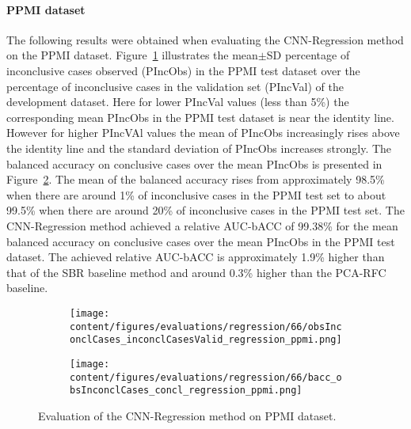 
\paragraph{PPMI dataset}

The following results were obtained when evaluating the CNN-Regression method on the PPMI dataset.
Figure~\ref{fig:obsInconclCases_inconclCasesValid_regression_ppmi} illustrates the
mean$\pm$SD percentage of inconclusive cases observed (PIncObs) in the PPMI test dataset 
over the percentage of inconclusive cases in the validation set (PIncVal) of the development dataset.
Here for lower PIncVal values (less than 5\%) the corresponding mean PIncObs 
in the PPMI test dataset is near the identity line.
However for higher PIncVAl values the mean of PIncObs increasingly rises above the identity line
and the standard deviation of PIncObs increases strongly.
The balanced accuracy on conclusive cases over the mean PIncObs is presented in Figure~\ref{fig:bacc_obsInconclCases_concl_regression_ppmi}.
The mean of the balanced accuracy rises from approximately 98.5\% 
when there are around 1\% of inconclusive cases in the PPMI test set to about 99.5\% 
when there are around 20\% of inconclusive cases in the PPMI test set.
The CNN-Regression method achieved a relative AUC-bACC of 99.38\% for the mean balanced accuracy on conclusive cases 
over the mean PIncObs in the PPMI test dataset.
The achieved relative AUC-bACC is approximately 1.9\% higher than that of the SBR baseline method 
and around 0.3\% higher than the PCA-RFC baseline.


\begin{figure}[ht]
  \begin{subfigure}{0.49\textwidth}
    \centering
    \texttt{[image: content/figures/evaluations/regression/66/obsInconclCases\_inconclCasesValid\_regression\_ppmi.png]}
    \label{fig:obsInconclCases_inconclCasesValid_regression_ppmi}
  \end{subfigure}
  \hfill
  \begin{subfigure}{0.49\textwidth}
    \centering
    \texttt{[image: content/figures/evaluations/regression/66/bacc\_obsInconclCases\_concl\_regression\_ppmi.png]}
    \label{fig:bacc_obsInconclCases_concl_regression_ppmi}
  \end{subfigure}
  \caption{Evaluation of the CNN-Regression method on PPMI dataset.}
  \label{fig:perf_regression_ppmi}
\end{figure}



